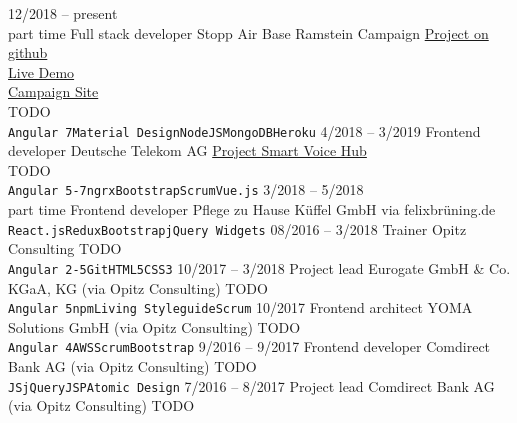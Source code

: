 \documentclass[9pt]{developercv} %
\begin{document}
\begin{entrylist}
	\entry
		{12/2018 -- present\\\footnotesize{part time}}
		{Full stack developer}
		{Stopp Air Base Ramstein Campaign}
    {
      \href{https://github.com/frot-io/ramstein-conference-app}{Project on github}\\
      \href{https://ramstein-conference-app.herokuapp.com/}{Live Demo}\\
      \href{https://www.ramstein-kampagne.eu/}{Campaign Site}\\
      TODO\\ 
      \texttt{Angular 7}\slashsep\texttt{Material Design}\slashsep\texttt{NodeJS}\slashsep\texttt{MongoDB}\slashsep\texttt{Heroku}
    }
  \entry
		{4/2018 -- 3/2019}
		{Frontend developer}
		{Deutsche Telekom AG}
    {
      \href{https://www.telekom.de/zuhause/geraete-und-zubehoer/smart-speaker}{Project Smart Voice Hub}\\
      TODO\\
      \texttt{Angular 5-7}\slashsep\texttt{ngrx}\slashsep\texttt{Bootstrap}\slashsep\texttt{Scrum}\slashsep\texttt{Vue.js}
    }
	\entry
		{3/2018 -- 5/2018\\\footnotesize{part time}}
		{Frontend developer}
		{Pflege zu Hause Küffel GmbH}
		{
      via felixbrüning.de\\
      \texttt{React.js}\slashsep\texttt{Redux}\slashsep\texttt{Bootstrap}\slashsep\texttt{jQuery Widgets}
    }
  \entry
		{08/2016 -- 3/2018}
		{Trainer}
		{Opitz Consulting}
		{
      TODO\\
      \texttt{Angular 2-5}\slashsep\texttt{Git}\slashsep\texttt{HTML5}\slashsep\texttt{CSS3}
    }
  \entry
		{10/2017 -- 3/2018}
		{Project lead}
		{Eurogate GmbH \& Co. KGaA, KG (via Opitz Consulting)}
		{
      TODO\\
      \texttt{Angular 5}\slashsep\texttt{npm}\slashsep\texttt{Living Styleguide}\slashsep\texttt{Scrum}
    }
  \entry
		{10/2017}
		{Frontend architect}
		{YOMA Solutions GmbH (via Opitz Consulting)}
		{
      TODO\\
      \texttt{Angular 4}\slashsep\texttt{AWS}\slashsep\texttt{Scrum}\slashsep\texttt{Bootstrap}
    }
  \entry
		{9/2016 -- 9/2017}
		{Frontend developer}
		{Comdirect Bank AG (via Opitz Consulting)}
		{
      TODO\\
      \texttt{JS}\slashsep\texttt{jQuery}\slashsep\texttt{JSP}\slashsep\texttt{Atomic Design}
    }
  \entry
		{7/2016 -- 8/2017}
		{Project lead}
		{Comdirect Bank AG (via Opitz Consulting)}
		{
      TODO\\
}
\end{entrylist}
\end{document}
